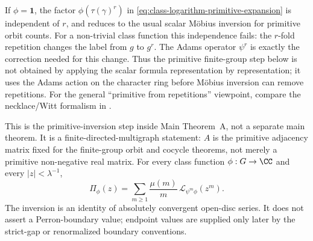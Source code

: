 \begin{remark}
  \label{rem:ordinary-mobius-stops}
  If \(\phi=\mathbf 1\), the factor
  \(\phi(\tau(\gamma)^r)\) in
  \eqref{eq:class-logarithm-primitive-expansion} is independent of
  \(r\), and  reduces to the
  usual scalar M\"obius inversion for primitive orbit counts. For a
  non-trivial class function this independence fails: the \(r\)-fold
  repetition changes the label from \(g\) to \(g^r\). The Adams operator
  \(\psi^r\) is exactly the correction needed for this change. Thus the
  primitive finite-group step below is not obtained by applying the
  scalar formula representation by representation; it uses the Adams
  action on the character ring before M\"obius inversion can remove
  repetitions. For the general ``primitive from repetitions'' viewpoint,
  compare the necklace/Witt formalism in
  \cite{MetropolisRota1983Necklaces,Wehrhahn1990AperiodicRings}.
\end{remark}

\begin{corollary}
  \label{cor:class-function-adams-mobius}
  This is the primitive-inversion step inside Main Theorem~A, not a separate
  main theorem.  It is a finite-directed-multigraph statement: \(A\) is the
  primitive adjacency matrix fixed for the finite-group orbit and cocycle
  theorems, not merely a primitive non-negative real matrix.  For every class
  function \(\phi:G\to\CC\) and every
  \(|z|<\lambda^{-1}\),
  \begin{equation}\label{eq:class-adams-mobius-inversion}
    \Pi_\phi(z)
    =
    \sum_{m\ge 1}\frac{\mu(m)}{m}\,
      \mathcal L_{\psi^m\phi}(z^m).
  \end{equation}
  The inversion is an identity of absolutely convergent open-disc series.  It
  does not assert a Perron-boundary value; endpoint values are supplied only
  later by the strict-gap or renormalized boundary conventions.
\end{corollary}

